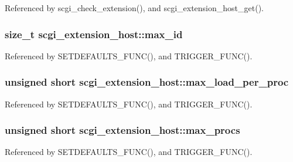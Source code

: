 Referenced by scgi\-\_\-check\-\_\-extension(), and scgi\-\_\-extension\-\_\-host\-\_\-get().

\hypertarget{structscgi__extension__host_a36bfb6179370a97e083db8e983cd1cc2}{
\subsubsection[{max\-\_\-id}]{\setlength{\rightskip}{0pt plus 5cm}size\-\_\-t scgi\-\_\-extension\-\_\-host\-::max\-\_\-id}}\label{structscgi__extension__host_a36bfb6179370a97e083db8e983cd1cc2}


Referenced by S\-E\-T\-D\-E\-F\-A\-U\-L\-T\-S\-\_\-\-F\-U\-N\-C(), and T\-R\-I\-G\-G\-E\-R\-\_\-\-F\-U\-N\-C().

\hypertarget{structscgi__extension__host_a15116f4d7279692537ff2214bd55e6fe}{
\subsubsection[{max\-\_\-load\-\_\-per\-\_\-proc}]{\setlength{\rightskip}{0pt plus 5cm}unsigned short scgi\-\_\-extension\-\_\-host\-::max\-\_\-load\-\_\-per\-\_\-proc}}\label{structscgi__extension__host_a15116f4d7279692537ff2214bd55e6fe}


Referenced by S\-E\-T\-D\-E\-F\-A\-U\-L\-T\-S\-\_\-\-F\-U\-N\-C(), and T\-R\-I\-G\-G\-E\-R\-\_\-\-F\-U\-N\-C().

\hypertarget{structscgi__extension__host_a84c4582067a8474d7547b8a81cc95a2d}{
\subsubsection[{max\-\_\-procs}]{\setlength{\rightskip}{0pt plus 5cm}unsigned short scgi\-\_\-extension\-\_\-host\-::max\-\_\-procs}}\label{structscgi__extension__host_a84c4582067a8474d7547b8a81cc95a2d}


Referenced by S\-E\-T\-D\-E\-F\-A\-U\-L\-T\-S\-\_\-\-F\-U\-N\-C(), and T\-R\-I\-G\-G\-E\-R\-\_\-\-F\-U\-N\-C().

